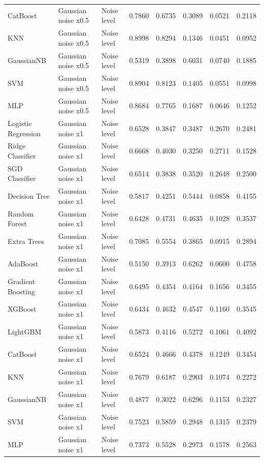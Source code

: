 \begin{tabular}{lllrrrrr}
CatBoost & Gaussian noise x0.5 & Noise level & 0.7860 & 0.6735 & 0.3089 & 0.0521 & 0.2118 \\
KNN & Gaussian noise x0.5 & Noise level & 0.8998 & 0.8294 & 0.1346 & 0.0451 & 0.0952 \\
GaussianNB & Gaussian noise x0.5 & Noise level & 0.5319 & 0.3898 & 0.6031 & 0.0740 & 0.1885 \\
SVM & Gaussian noise x0.5 & Noise level & 0.8904 & 0.8123 & 0.1405 & 0.0551 & 0.0998 \\
MLP & Gaussian noise x0.5 & Noise level & 0.8684 & 0.7765 & 0.1687 & 0.0646 & 0.1252 \\
Logistic Regression & Gaussian noise x1 & Noise level & 0.6528 & 0.3847 & 0.3487 & 0.2670 & 0.2481 \\
Ridge Classifier & Gaussian noise x1 & Noise level & 0.6668 & 0.4030 & 0.3250 & 0.2711 & 0.1528 \\
SGD Classifier & Gaussian noise x1 & Noise level & 0.6514 & 0.3838 & 0.3520 & 0.2648 & 0.2500 \\
Decision Tree & Gaussian noise x1 & Noise level & 0.5817 & 0.4251 & 0.5444 & 0.0858 & 0.4155 \\
Random Forest & Gaussian noise x1 & Noise level & 0.6428 & 0.4731 & 0.4635 & 0.1028 & 0.3537 \\
Extra Trees & Gaussian noise x1 & Noise level & 0.7085 & 0.5554 & 0.3865 & 0.0915 & 0.2894 \\
AdaBoost & Gaussian noise x1 & Noise level & 0.5150 & 0.3913 & 0.6262 & 0.0600 & 0.4758 \\
Gradient Boosting & Gaussian noise x1 & Noise level & 0.6495 & 0.4354 & 0.4164 & 0.1656 & 0.3455 \\
XGBoost & Gaussian noise x1 & Noise level & 0.6434 & 0.4632 & 0.4547 & 0.1160 & 0.3545 \\
LightGBM & Gaussian noise x1 & Noise level & 0.5873 & 0.4116 & 0.5272 & 0.1061 & 0.4092 \\
CatBoost & Gaussian noise x1 & Noise level & 0.6524 & 0.4666 & 0.4378 & 0.1249 & 0.3454 \\
KNN & Gaussian noise x1 & Noise level & 0.7679 & 0.6187 & 0.2903 & 0.1074 & 0.2272 \\
GaussianNB & Gaussian noise x1 & Noise level & 0.4877 & 0.3022 & 0.6296 & 0.1153 & 0.2327 \\
SVM & Gaussian noise x1 & Noise level & 0.7523 & 0.5859 & 0.2948 & 0.1315 & 0.2379 \\
MLP & Gaussian noise x1 & Noise level & 0.7373 & 0.5528 & 0.2973 & 0.1578 & 0.2563 \\

\end{tabular}
